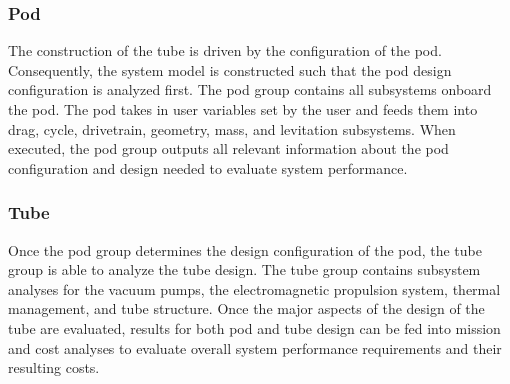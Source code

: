 \subsubsection{Pod}
	The construction of the tube is driven by the configuration of the pod. Consequently, the system model is constructed such that the pod design configuration is analyzed first. The pod group contains all subsystems onboard the pod. The pod takes in user variables set by the user and feeds them into drag, cycle, drivetrain, geometry, mass, and levitation subsystems. When executed, the pod group outputs all relevant information about the pod configuration and design needed to evaluate system performance.
\subsubsection{Tube}
	Once the pod group determines the design configuration of the pod, the tube group is able to analyze the tube design. The tube group contains subsystem analyses for the vacuum pumps, the electromagnetic propulsion system, thermal management, and tube structure. Once the major aspects of the design of the tube are evaluated, results for both pod and tube design can be fed into mission and cost analyses to evaluate overall system performance requirements and their resulting costs.
